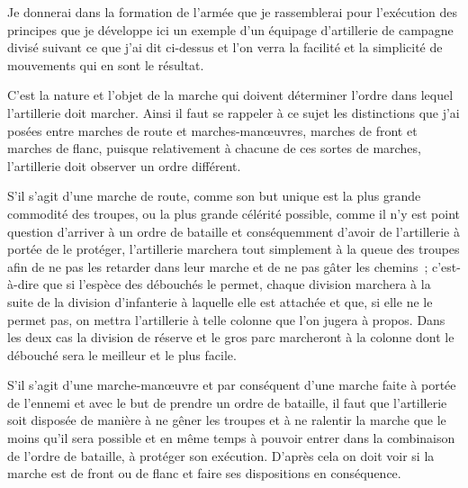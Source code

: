 \documentclass[french,twoside]{book} %
\begin{document}
Je donnerai dans la formation de l’armée que je rassemblerai pour l’exécution des principes que je développe ici un exemple d’un équipage d’artillerie de campagne divisé suivant ce que j’ai dit ci-dessus et l’on verra la facilité et la simplicité de mouvements qui en sont le résultat.\par
C’est la nature et l’objet de la marche qui doivent déterminer l’ordre dans lequel l’artillerie doit marcher. Ainsi il faut se rappeler à ce sujet les distinctions que j’ai posées entre marches de route et marches-manœuvres, marches de front et marches de flanc, puisque relativement à chacune de ces sortes de marches, l’artillerie doit observer un ordre différent.\par
S’il s’agit d’une marche de route, comme son but unique est la plus grande commodité des troupes, ou la plus grande célérité possible, comme il n’y est point question d’arriver à un ordre de bataille et conséquemment d’avoir de l’artillerie à portée de le protéger, l’artillerie marchera tout simplement à la queue des troupes afin de ne pas les retarder dans leur marche et de ne pas gâter les chemins ; c’est-à-dire que si l’espèce des débouchés le permet, chaque division marchera à la suite de la division d’infanterie à laquelle elle est attachée et que, si elle ne le permet pas, on mettra l’artillerie à telle colonne que l’on jugera à propos. Dans les deux cas la division de réserve et le gros parc marcheront à la colonne dont le débouché sera le meilleur et le plus facile.\par
S’il s’agit d’une marche-manœuvre et par conséquent d’une marche faite à portée de l’ennemi et avec le but de prendre un ordre de bataille, il faut que l’artillerie soit disposée de manière à ne gêner les troupes et à ne ralentir la marche que le moins qu’il sera possible et en même temps à pouvoir entrer dans la combinaison de l’ordre de bataille, à protéger son exécution. D’après cela on doit voir si la marche est de front ou de flanc et faire ses dispositions en conséquence.\par
\end{document}
